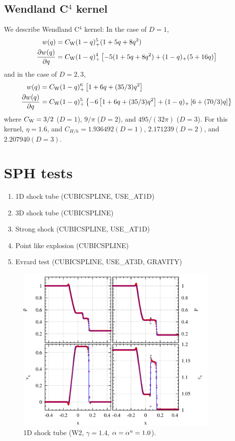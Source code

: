 \documentclass[fleqn,dvipdfmx]{article}
\begin{document}
\subsection{Wendland C$^4$ kernel}

We describe Wendland C$^4$ kernel: In the case of $D = 1$,
\begin{align}
  w(q) &= C_{\rm W} (1-q)_+^5 (1+5q+8q^2) \\
  \frac{\partial w(q)}{\partial q} &= C_{\rm W} (1-q)_+^4 \left[
    -5(1+5q+8q^2) + (1-q)_+ (5+16q) \right]
\end{align}
and in the case of $D = 2, 3$,
\begin{align}
  w(q) &= C_{\rm W} (1-q)_+^6 \left[ 1+6q+(35/3)q^2 \right] \\
  \frac{\partial w(q)}{\partial q} &= C_{\rm W} (1-q)_+^5 \left\{-6
  \left[ 1+6q+(35/3)q^2 \right] + (1-q)_+ \left[ 6+(70/3)q \right]
  \right\}
\end{align}
where $C_{\rm W}=3/2$ ($D=1$), $9/\pi$ ($D=2$), and $495/(32\pi)$
($D=3$). For this kernel, $\eta=1.6$, and $C_{H/h}=1.936492(D=1)$,
$2.171239(D=2)$, and $2.207940(D=3)$.

\section{SPH tests}

\begin{enumerate}
\item 1D shock tube (CUBICSPLINE, USE\_AT1D)
\item 3D shock tube (CUBICSPLINE)
\item Strong shock (CUBICSPLINE, USE\_AT1D)
\item Point like explosion (CUBICSPLINE)
\item Evrard test (CUBICSPLINE, USE\_AT3D, GRAVITY)
\end{enumerate}

\begin{figure}
  \begin{center}
    \includegraphics[width=10cm,bb=0 0 1020 840]{fig/shock_1d/draw.png}
  \end{center}
  \caption{1D shock tube (W2, $\gamma=1.4$, $\alpha=\alpha^{\rm
      u}=1.0$).}
\end{figure}
\end{document}
